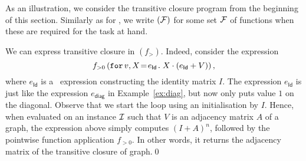 As an illustration, we consider the transitive closure program from the beginning of this section. Similarly as for \lang, we write \langfor$(\Fun)$ for some set $\Fun$ of functions when these are required for the task at hand.
\begin{example}
 We can express transitive closure in \langfor$(f_>)$. Indeed, consider the expression 
$$
f_{>0}\left(\initf{e_{\mathsf{Id}}}{v}{X}{X\cdot (e_{\mathsf{Id}}+V)}\right),
$$
where $e_{\mathsf{Id}}$ is a \langfor\ expression constructing the identity matrix $I$. The expression $e_{\mathsf{Id}}$
is just like the expression $e_{\mathsf{diag}}$ in Example~\ref{ex:diag}, but now only puts value $1$ on the diagonal.
 Observe that we start the loop using an initialisation by $I$. Hence, when evaluated on an instance $\I$ such that $V$ is an adjacency matrix $A$ of a graph, the expression above simply computes $(I+A)^n$, followed by the pointwise function application $f_{>0}$. In other words, it returns the adjacency matrix of the transitive closure of graph.\qed
\end{example}
%



